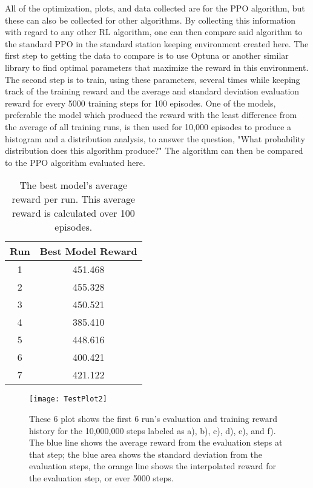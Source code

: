 All of the optimization, plots, and data collected are for the PPO algorithm, but these can also be collected for other algorithms. By collecting this information with regard to any other RL algorithm, one can then compare said algorithm to the standard PPO in the standard station keeping environment created here. The first step to getting the data to compare is to use Optuna or another similar library to find optimal parameters that maximize the reward in this environment. The second step is to train, using these parameters, several times while keeping track of the training reward and the average and standard deviation evaluation reward for every 5000 training steps for 100 episodes. One of the models, preferable the model which produced the reward with the least difference from the average of all training runs, is then used for 10,000 episodes to produce a histogram and a distribution analysis, to answer the question, "What probability distribution does this algorithm produce?" The algorithm can then be compared to the PPO algorithm evaluated here.

\begin{table}
	\centering
	\begin{tabular}{|c|c|} \hline
		Run & Best Model Reward \\\hline\hline
		1 & 451.468 \\\hline
		2 & 455.328 \\\hline
		3 & 450.521 \\\hline
		4 & 385.410 \\\hline
		5 & 448.616 \\\hline
		6 & 400.421 \\\hline
		7 & 421.122 \\\hline
	\end{tabular}
	\caption{The best model's average reward per run. This average reward is calculated over 100 episodes.}
	\label{table:best_evaluation_rewards}
\end{table}

\begin{figure}
	\centering
	\texttt{[image: TestPlot2]}
	\caption{These 6 plot shows the first 6 run's evaluation and training reward history for the 10,000,000 steps labeled as a), b), c), d), e), and f). The blue line shows the average reward from the evaluation steps at that step; the blue area shows the standard deviation from the evaluation steps, the orange line shows the interpolated reward for the evaluation step, or ever 5000 steps. }
	\label{fig:validation_runs}
\end{figure}

